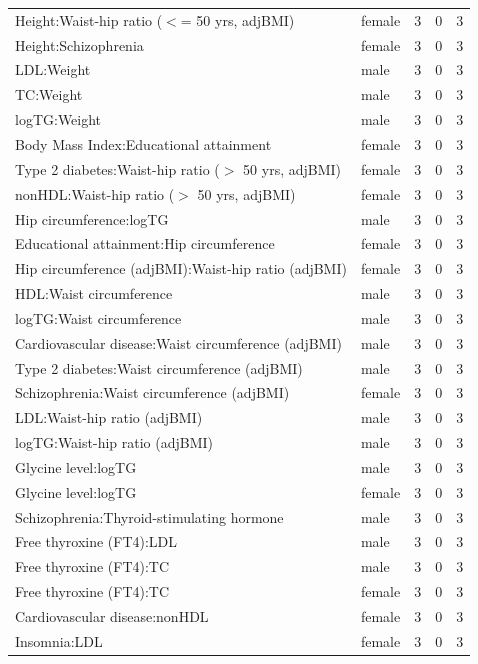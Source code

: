 \begin{table}[ht]
\begin{tabular}{llrrr}
  Height:Waist-hip ratio ($<$= 50 yrs, adjBMI) & female &   3 &   0 &   3 \\ 
  Height:Schizophrenia & female &   3 &   0 &   3 \\ 
  LDL:Weight & male &   3 &   0 &   3 \\ 
  TC:Weight & male &   3 &   0 &   3 \\ 
  logTG:Weight & male &   3 &   0 &   3 \\ 
  Body Mass Index:Educational attainment & female &   3 &   0 &   3 \\ 
  Type 2 diabetes:Waist-hip ratio ($>$ 50 yrs, adjBMI) & female &   3 &   0 &   3 \\ 
  nonHDL:Waist-hip ratio ($>$ 50 yrs, adjBMI) & female &   3 &   0 &   3 \\ 
  Hip circumference:logTG & male &   3 &   0 &   3 \\ 
  Educational attainment:Hip circumference & female &   3 &   0 &   3 \\ 
  Hip circumference (adjBMI):Waist-hip ratio (adjBMI) & female &   3 &   0 &   3 \\ 
  HDL:Waist circumference & male &   3 &   0 &   3 \\ 
  logTG:Waist circumference & male &   3 &   0 &   3 \\ 
  Cardiovascular disease:Waist circumference (adjBMI) & male &   3 &   0 &   3 \\ 
  Type 2 diabetes:Waist circumference (adjBMI) & male &   3 &   0 &   3 \\ 
  Schizophrenia:Waist circumference (adjBMI) & female &   3 &   0 &   3 \\ 
  LDL:Waist-hip ratio (adjBMI) & male &   3 &   0 &   3 \\ 
  logTG:Waist-hip ratio (adjBMI) & male &   3 &   0 &   3 \\ 
  Glycine level:logTG & male &   3 &   0 &   3 \\ 
  Glycine level:logTG & female &   3 &   0 &   3 \\ 
  Schizophrenia:Thyroid-stimulating hormone & male &   3 &   0 &   3 \\ 
  Free thyroxine (FT4):LDL & male &   3 &   0 &   3 \\ 
  Free thyroxine (FT4):TC & male &   3 &   0 &   3 \\ 
  Free thyroxine (FT4):TC & female &   3 &   0 &   3 \\ 
  Cardiovascular disease:nonHDL & female &   3 &   0 &   3 \\ 
  Insomnia:LDL & female &   3 &   0 &   3 \\ 

\end{tabular}
\end{table}
